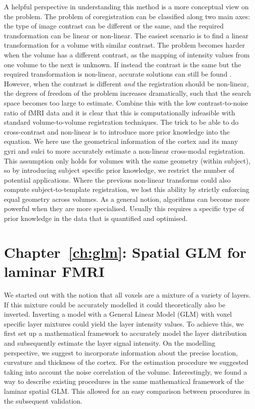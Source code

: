 A helpful perspective in understanding this method is a more conceptual view on the problem. The problem of coregistration can be classified along two main axes: the type of image contrast can be different or the same, and the required transformation can be linear or non-linear. The easiest scenario is to find a linear transformation for a volume with similar contrast. The problem becomes harder when the volume has a different contrast, as the mapping of intensity values from one volume to the next is unknown. If instead the contrast is the same but the required transformation is non-linear, accurate solutions can still be found \cite{Collins1995}. However, when the contrast is different \emph{and} the registration should be non-linear, the degrees of freedom of the problem increases dramatically, such that the search space becomes too large to estimate. Combine this with the low contrast-to-noise ratio of fMRI data and it is clear that this is computationally infeasible with standard volume-to-volume registration techniques. The trick to be able to do cross-contrast and non-linear is to introduce more prior knowledge into the equation. We here use the geometrical information of the cortex and its many gyri and sulci to more accurately estimate a non-linear cross-modal registration. This assumption only holds for volumes with the same geometry (within subject), so by introducing subject specific prior knowledge, we restrict the number of potential applications. Where the previous non-linear transforms could also compute subject-to-template registration, we lost this ability by strictly enforcing equal geometry across volumes. As a general notion, algorithms can become more powerful when they are more specialised. Usually this requires a specific type of prior knowledge in the data that is quantified and optimised.

\section*{Chapter~\ref{ch:glm}: Spatial GLM for laminar FMRI}
We started out with the notion that all voxels are a mixture of a variety of layers. If this mixture could be accurately modelled it could theoretically also be inverted.
Inverting a model with a General Linear Model (GLM) with voxel specific layer mixtures could yield the layer intensity values. To achieve this, we first set up a mathematical framework to accurately model the layer distribution and subsequently estimate the layer signal intensity. On the modelling perspective, we suggest to incorporate information about the precise location, curvature and thickness of the cortex. For the estimation procedure we suggested taking into account the noise correlation of the volume. Interestingly, we found a way to describe existing procedures in the same mathematical framework of the laminar spatial GLM. This allowed for an easy comparison between procedures in the subsequent validation.

